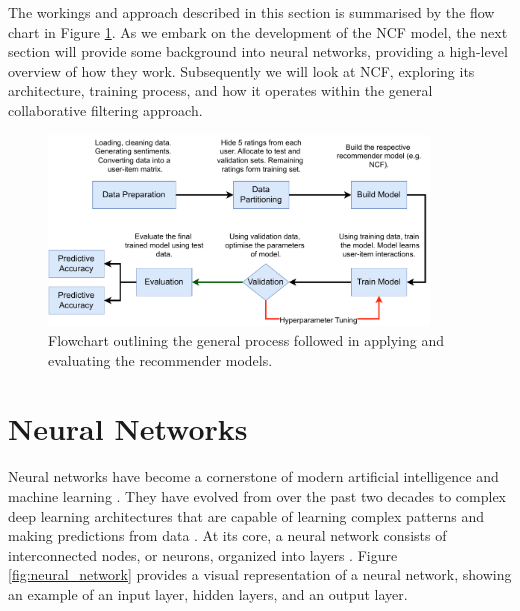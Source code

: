 The workings and approach described in this section is summarised by the flow chart in Figure \ref{fig:flowchart of process}. As we embark on the development of the NCF model, the next section will provide some background into neural networks, providing a high-level overview of how they work. Subsequently we will look at NCF, exploring its architecture, training process, and how it operates within the general collaborative filtering approach.

\begin{figure}[h]
    \centering
    \includegraphics[width=0.9\textwidth]{Figures/flowchart of model process-4.pdf} %
    \caption{Flowchart outlining the general process followed in applying and evaluating the recommender models.}
    \label{fig:flowchart of process}
  \end{figure}
  
  \section{Neural Networks}
  \label{sec:4 Neural Networks}

Neural networks have become a cornerstone of modern artificial intelligence and machine learning \cite{abdi1999neural}. They have evolved from over the past two decades to complex deep learning architectures that are capable of learning complex patterns and making predictions from data \cite{gurney2018introduction}. At its core, a neural network consists of interconnected nodes, or neurons, organized into layers \cite{abdi1999neural}. Figure \ref{fig:neural_network} provides a visual representation of a neural network, showing an example of an input layer, hidden layers, and an output layer.

